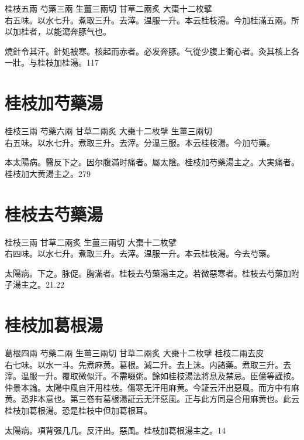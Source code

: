 桂枝{\scriptsize 五兩} 芍藥{\scriptsize 三兩} 生薑{\scriptsize 三兩切} 甘草{\scriptsize 二兩炙} 大棗{\scriptsize 十二枚擘}\\
右五味。以水七升。煮取三升。去滓。温服一升。本云桂枝湯。今加桂滿五兩。所以加桂者，以能瀉奔豚气也。

燒針令其汗。針処被寒。核起而赤者。必发奔豚。气從少腹上衝心者。灸其核上各一壯。与桂枝加桂湯。117

\section{桂枝加芍藥湯}

桂枝{\scriptsize 三兩} 芍藥{\scriptsize 六兩} 甘草{\scriptsize 二兩炙} 大棗{\scriptsize 十二枚擘} 生薑{\scriptsize 三兩切}\\
右五味。以水七升。煮取三升。去滓。分温三服。本云桂枝湯。今加芍藥。

{\khaaitp 本}太陽病。醫反下之。因尔腹滿时痛者。屬太陰。桂枝加芍藥湯主之。大実痛者。桂枝加大黄湯主之。279

\section{桂枝去芍藥湯}

桂枝{\scriptsize 三兩} 甘草{\scriptsize 二兩炙} 生薑{\scriptsize 三兩切} 大棗{\scriptsize 十二枚擘}\\
右四味。以水七升。煮取三升。去滓。温服一升。本云桂枝湯。今去芍藥。

太陽病。下之。脉促。胸滿者。桂枝去芍藥湯主之。若微{\khaaitp 惡}寒者。桂枝去芍藥加附子湯主之。21.22

\section{桂枝加葛根湯}

葛根{\scriptsize 四兩} 芍藥{\scriptsize 二兩} 生薑{\scriptsize 三兩切} 甘草{\scriptsize 二兩炙} 大棗{\scriptsize 十二枚擘} 桂枝{\scriptsize 二兩去皮}\\
右七味。以水一斗。先煮麻黄。葛根。減二升。去上沫。内諸藥。煮取三升。去滓。温服一升。覆取微似汗。不需啜粥。餘如桂枝湯法將息及禁忌。{\scriptsize 臣億等謹按。仲景本論。太陽中風自汗用桂枝。傷寒无汗用麻黄。今証云汗出惡風。而方中有麻黄。恐非本意也。第三卷有葛根湯証云无汗惡風。正与此方同是合用麻黄也。此云桂枝加葛根湯。恐是桂枝中但加葛根耳。}

太陽病。項背强几几。反汗出。惡風。桂枝{\khaaitp 加葛根}湯主之。14

